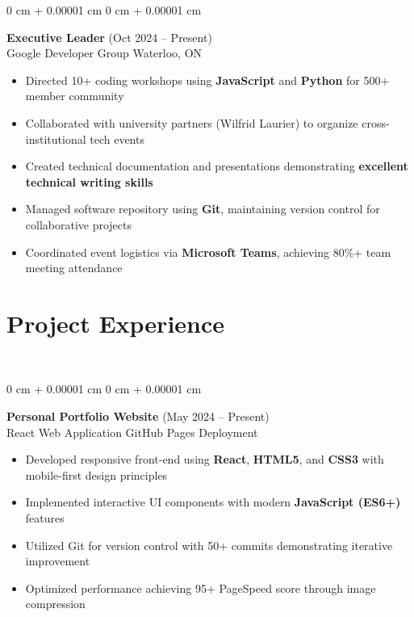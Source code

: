 \documentclass[11pt]{article}
\newenvironment{highlights}{
    \begin{itemize}[
        topsep=0.10 cm,
        parsep=0.10 cm,
        partopsep=0pt,
        itemsep=0pt,
        leftmargin=0 cm + 10pt
    ]
}{
    \end{itemize}
}
\newenvironment{onecolentry}{
    \begin{adjustwidth}{
        0 cm + 0.00001 cm
    }{
        0 cm + 0.00001 cm
    }
}{
    \end{adjustwidth}
}
\begin{document}
\begin{onecolentry}
    {\normalsize \textbf{Executive Leader}} \hfill {(Oct 2024 – Present)}\\
    {Google Developer Group} \hfill {Waterloo, ON}\\
    \begin{highlights}
        \item Directed 10+ coding workshops using \textbf{JavaScript} and \textbf{Python} for 500+ member community
        \item Collaborated with university partners (Wilfrid Laurier) to organize cross-institutional tech events
        \item Created technical documentation and presentations demonstrating \textbf{excellent technical writing skills}
        \item Managed software repository using \textbf{Git}, maintaining version control for collaborative projects
        \item Coordinated event logistics via \textbf{Microsoft Teams}, achieving 80\%+ team meeting attendance
    \end{highlights}
\end{onecolentry}

\vspace{-12pt}
\section{Project Experience}
\vspace{-12pt}
\hrulefill\\
\begin{onecolentry}
    {\normalsize \textbf{Personal Portfolio Website}} \hfill {(May 2024 – Present)}\\
    {React Web Application} \hfill {GitHub Pages Deployment}\\
    \begin{highlights}
        \item Developed responsive front-end using \textbf{React}, \textbf{HTML5}, and \textbf{CSS3} with mobile-first design principles
        \item Implemented interactive UI components with modern \textbf{JavaScript (ES6+)} features
        \item Utilized Git for version control with 50+ commits demonstrating iterative improvement
        \item Optimized performance achieving 95+ PageSpeed score through image compression
    \end{highlights}
\end{onecolentry}
\end{document}
